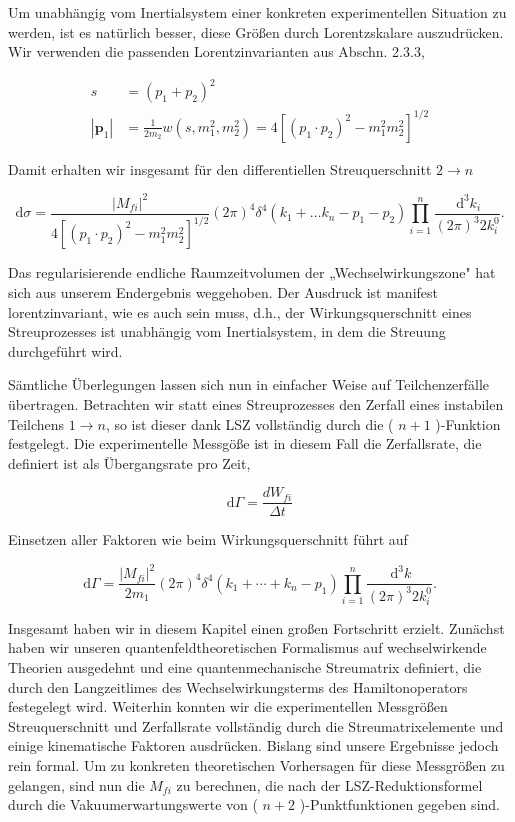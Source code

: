 \documentclass[10pt, letterpaper]{article}
\begin{document}
Um unabhängig vom Inertialsystem einer konkreten experimentellen Situation zu werden, ist es natürlich besser, diese Größen durch Lorentzskalare auszudrücken. Wir verwenden die passenden Lorentzinvarianten aus Abschn. 2.3.3,

$$
\begin{aligned}
s & =\left(p_{1}+p_{2}\right)^{2} \\
\left|\mathbf{p}_{1}\right| & =\frac{1}{2 m_{2}} w\left(s, m_{1}^{2}, m_{2}^{2}\right)=4\left[\left(p_{1} \cdot p_{2}\right)^{2}-m_{1}^{2} m_{2}^{2}\right]^{1 / 2}
\end{aligned}
$$

Damit erhalten wir insgesamt für den differentiellen Streuquerschnitt $2 \rightarrow n$

$$
\mathrm{d} \sigma=\frac{\left|M_{f i}\right|^{2}}{4\left[\left(p_{1} \cdot p_{2}\right)^{2}-m_{1}^{2} m_{2}^{2}\right]^{1 / 2}}(2 \pi)^{4} \delta^{4}\left(k_{1}+\ldots k_{n}-p_{1}-p_{2}\right) \prod_{i=1}^{n} \frac{\mathrm{~d}^{3} k_{i}}{(2 \pi)^{3} 2 k_{i}^{0}} .
$$

Das regularisierende endliche Raumzeitvolumen der „Wechselwirkungszone" hat sich aus unserem Endergebnis weggehoben. Der Ausdruck ist manifest lorentzinvariant, wie es auch sein muss, d.h., der Wirkungsquerschnitt eines Streuprozesses ist unabhängig vom Inertialsystem, in dem die Streuung durchgeführt wird.

Sämtliche Überlegungen lassen sich nun in einfacher Weise auf Teilchenzerfälle übertragen. Betrachten wir statt eines Streuprozesses den Zerfall eines instabilen Teilchens $1 \longrightarrow n$, so ist dieser dank LSZ vollständig durch die ( $n+1$ )-Funktion festgelegt. Die experimentelle Messgöße ist in diesem Fall die Zerfallsrate, die definiert ist als Übergangsrate pro Zeit,

$$
\mathrm{d} \Gamma=\frac{d W_{f i}}{\Delta t}
$$

Einsetzen aller Faktoren wie beim Wirkungsquerschnitt führt auf

$$
\mathrm{d} \Gamma=\frac{\left|M_{f i}\right|^{2}}{2 m_{1}}(2 \pi)^{4} \delta^{4}\left(k_{1}+\cdots+k_{n}-p_{1}\right) \prod_{i=1}^{n} \frac{\mathrm{~d}^{3} k}{(2 \pi)^{3} 2 k_{i}^{0}} .
$$

Insgesamt haben wir in diesem Kapitel einen großen Fortschritt erzielt. Zunächst haben wir unseren quantenfeldtheoretischen Formalismus auf wechselwirkende Theorien ausgedehnt und eine quantenmechanische Streumatrix definiert, die durch den Langzeitlimes des Wechselwirkungsterms des Hamiltonoperators festegelegt wird. Weiterhin konnten wir die experimentellen Messgrößen Streuquerschnitt und Zerfallsrate vollständig durch die Streumatrixelemente und einige kinematische Faktoren ausdrücken. Bislang sind unsere Ergebnisse jedoch rein formal. Um zu konkreten theoretischen Vorhersagen für diese Messgrößen zu gelangen, sind nun die $M_{f i}$ zu berechnen, die nach der LSZ-Reduktionsformel durch die Vakuumerwartungswerte von ( $n+2$ )-Punktfunktionen gegeben sind.
\end{document}
